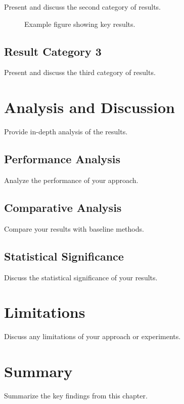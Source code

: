 Present and discuss the second category of results.

\begin{figure}[htbp]
\centering
\caption{Example figure showing key results.}
\label{fig:results1}
\end{figure}

\subsection{Result Category 3}
\label{subsec:result3}

Present and discuss the third category of results.

\section{Analysis and Discussion}
\label{sec:analysis}

Provide in-depth analysis of the results.

\subsection{Performance Analysis}
\label{subsec:performance}

Analyze the performance of your approach.

\subsection{Comparative Analysis}
\label{subsec:comparative}

Compare your results with baseline methods.

\subsection{Statistical Significance}
\label{subsec:statistical}

Discuss the statistical significance of your results.

\section{Limitations}
\label{sec:limitations}

Discuss any limitations of your approach or experiments.

\section{Summary}
\label{sec:results-summary}

Summarize the key findings from this chapter.

